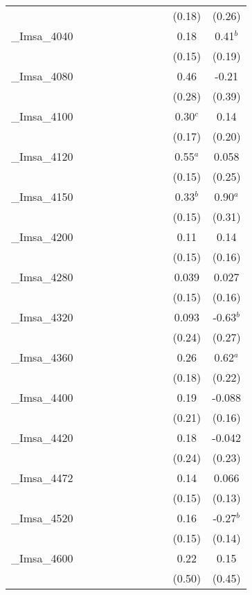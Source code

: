 \documentclass[]{article}
\begin{document}
\begin{tabular}{lcccccccccc}
 &  &  &  &  &  &  &  &  & (0.18) & (0.26) \\
\_Imsa\_4040 &  &  &  &  &  &  &  &  & 0.18 & 0.41$^b$ \\
 &  &  &  &  &  &  &  &  & (0.15) & (0.19) \\
\_Imsa\_4080 &  &  &  &  &  &  &  &  & 0.46 & -0.21 \\
 &  &  &  &  &  &  &  &  & (0.28) & (0.39) \\
\_Imsa\_4100 &  &  &  &  &  &  &  &  & 0.30$^c$ & 0.14 \\
 &  &  &  &  &  &  &  &  & (0.17) & (0.20) \\
\_Imsa\_4120 &  &  &  &  &  &  &  &  & 0.55$^a$ & 0.058 \\
 &  &  &  &  &  &  &  &  & (0.15) & (0.25) \\
\_Imsa\_4150 &  &  &  &  &  &  &  &  & 0.33$^b$ & 0.90$^a$ \\
 &  &  &  &  &  &  &  &  & (0.15) & (0.31) \\
\_Imsa\_4200 &  &  &  &  &  &  &  &  & 0.11 & 0.14 \\
 &  &  &  &  &  &  &  &  & (0.15) & (0.16) \\
\_Imsa\_4280 &  &  &  &  &  &  &  &  & 0.039 & 0.027 \\
 &  &  &  &  &  &  &  &  & (0.15) & (0.16) \\
\_Imsa\_4320 &  &  &  &  &  &  &  &  & 0.093 & -0.63$^b$ \\
 &  &  &  &  &  &  &  &  & (0.24) & (0.27) \\
\_Imsa\_4360 &  &  &  &  &  &  &  &  & 0.26 & 0.62$^a$ \\
 &  &  &  &  &  &  &  &  & (0.18) & (0.22) \\
\_Imsa\_4400 &  &  &  &  &  &  &  &  & 0.19 & -0.088 \\
 &  &  &  &  &  &  &  &  & (0.21) & (0.16) \\
\_Imsa\_4420 &  &  &  &  &  &  &  &  & 0.18 & -0.042 \\
 &  &  &  &  &  &  &  &  & (0.24) & (0.23) \\
\_Imsa\_4472 &  &  &  &  &  &  &  &  & 0.14 & 0.066 \\
 &  &  &  &  &  &  &  &  & (0.15) & (0.13) \\
\_Imsa\_4520 &  &  &  &  &  &  &  &  & 0.16 & -0.27$^b$ \\
 &  &  &  &  &  &  &  &  & (0.15) & (0.14) \\
\_Imsa\_4600 &  &  &  &  &  &  &  &  & 0.22 & 0.15 \\
 &  &  &  &  &  &  &  &  & (0.50) & (0.45) \\

\end{tabular}
\end{document}
